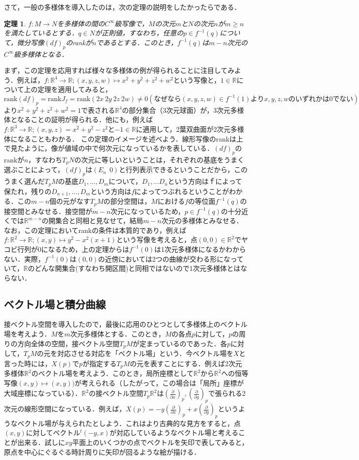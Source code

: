 \documentclass{jsarticle}
\def\realnum{{\mathbb R}}
\def\dfrac{\displaystyle\frac}
\def\tenchi{{}^t\!}
\def\rank{{\mathrm{rank}}}
\def\delxp{\left(\dfrac{\partial}{\partial x}\right)_p}
\def\delyp{\left(\dfrac{\partial}{\partial y}\right)_p}
\newtheorem{theo}{定理}
\begin{document}
さて，一般の多様体を導入したのは，次の定理の説明をしたかったらである．
\begin{theo}
$f:M\rightarrow N$を多様体の間の$C^\infty$級写像で，$M$の次元$m$と$N$の次元$n$が$m\ge n$を満たしているとする．$q\in N$が正則値，すなわち，任意の$p\in f^{-1}(q)$について，微分写像$(df)_p$のrankが$n$であるとする．このとき，$f^{-1}(q)$は$m-n$次元の$C^{\infty}$級多様体となる．
\end{theo}
まず，この定理を応用すれば様々な多様体の例が得られることに注目してみよう．例えば，$f:\realnum^4 \rightarrow \realnum;(x,y,z,w)\mapsto x^2+y^2+z^2+w^2$という写像と，$1\in \realnum$について上の定理を適用してみると，$\rank(df)_p=\rank J_{f}=\rank(2x\:2y\:2z\:2w)\neq 0 (なぜなら(x,y,z,w)\in f^{-1}(1)よりx,y,z,wのいずれかは0でない)$より$x^2+y^2+z^2+w^2=1$で表される$\realnum^4$の部分集合（3次元球面）が，3次元多様体となることの証明が得られる．他にも，例えば$f:\realnum^3\rightarrow \realnum;(x,y,z)=x^2+y^2-z^2$と$-1\in\realnum$に適用して，2葉双曲面が2次元多様体になることもわかる．
この定理のイメージを述べよう．線形写像のrankは上で見たように，像が値域の中で何次元になっているかを表している．$(df)_p$のrankが$n$，すなわち$T_pN$の次元に等しいということは，それぞれの基底をうまく選ぶことによって，$(df)_p$は$(E_n\:\:0)$と行列表示できるということだから，このうまく選んだ$T_pM$の基底$D_1,\dots,D_m$について，$D_1,\dots D_n$という方向は$ｆ$によって保たれ，残りの$D_{n+1},\dots,D_m$という方向は$f$によってつぶれるということがわかる．この$m-n$個の元がなす$T_pM$の部分空間は，$M$における$f$の等位面$f^{-1}(q)$の接空間とみなせる．接空間が$m-n$次元になっているため，$p\in f^{-1}(q)$の十分近くでは$\realnum^{m-n}$の開集合と同相と見なせて，結局$m-n$次元の多様体とみなせる．なお，この定理においてrankの条件は本質的であり，例えば$f:\realnum^2\rightarrow\realnum;(x,y)\mapsto y^2-x^2(x+1)$という写像を考えると，点$(0,0)\in\realnum^2$でヤコビ行列が0になるため，上の定理からは$f^{-1}(0)$は1次元多様体になるかわからない．実際，$f^{-1}(0)$は$(0,0)$の近傍においては2つの曲線が交わる形になっていて，$\realnum$のどんな開集合(すなわち開区間)と同相ではないので1次元多様体とはならない．


\subsection{ベクトル場と積分曲線}
接ベクトル空間を導入したので，最後に応用のひとつとして多様体上のベクトル場を考えよう．$M$を$m$次元多様体とする．このとき，$M$の各点$p$に対して，$p$の周りの方向全体の空間，接ベクトル空間$T_pM$が定まっているのであった．各$p$に対して，$T_pM$の元を対応させる対応を「ベクトル場」という．今ベクトル場を$X$と言った時には，$X(p)$で$p$が指定する$T_pM$の元を表すことにする．例えば2次元多様体$\realnum^2$のベクトル場を考えよう．このとき，局所座標として$\realnum^2$から$\realnum^2$への恒等写像$(x,y)\mapsto (x,y))$が考えられる（したがって，この場合は「局所」座標が大域座標になっている）．$\realnum^2$の接ベクトル空間$T_p\realnum^2$は$\delxp,\delyp$で張られる2次元の線形空間になっている．例えば，$X(p)=-y\delxp+x\delyp$というようなベクトル場が与えられたとしよう．これはより古典的な見方をすると，点$(x,y)$に対してベクトル$\tenchi(-y,x)$が対応しているようなベクトル場と考えることが出来る．試しに$xy$平面上のいくつかの点でベクトルを矢印で表してみると，原点を中心にぐるぐる時計周りに矢印が回るような絵が描ける．
\end{document}
